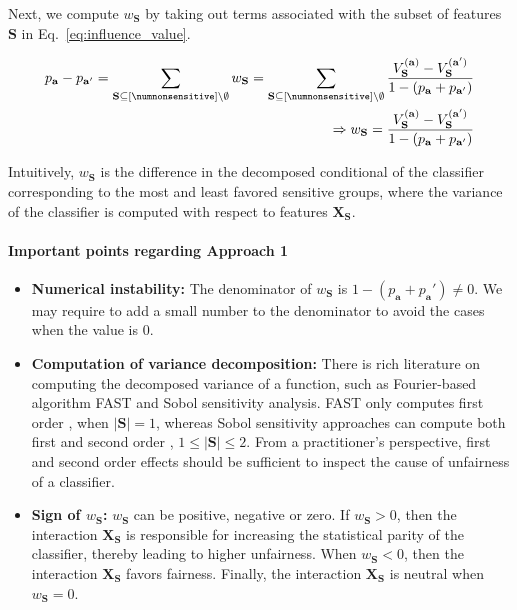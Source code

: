 Next, we compute $ w_{\mathbf{S}} $ by taking out terms associated with the subset of features $ \mathbf{S} $ in Eq.~\ref{eq:influence_value}. 

\begin{align*}
p_\mathbf{a} -  p_\mathbf{a'} =  \sum_{\mathbf{S} \subseteq [\numnonsensitive] \setminus \emptyset} w_{\mathbf{S}} = \sum_{\mathbf{S} \subseteq [\numnonsensitive] \setminus \emptyset} \frac{ V_{\mathbf{S}}^{(\mathbf{a})} - V_{\mathbf{S}}^{(\mathbf{a'})}}{1 - (p_\mathbf{a} + p_\mathbf{a'})} \\
\Rightarrow w_{\mathbf{S}} = \frac{V_{\mathbf{S}}^{(\mathbf{a})} - V_{\mathbf{S}}^{(\mathbf{a'})}}{1 - (p_\mathbf{a} + p_\mathbf{a'})}
\end{align*}


Intuitively, $ w_{\mathbf{S}} $ is the difference in the decomposed conditional  of the classifier corresponding to the most and least favored sensitive groups, where the variance of the classifier is computed with respect to features $ \mathbf{X}_{\mathbf{S}} $. 


\paragraph{Important points regarding Approach 1}
\begin{itemize}
	\item \textbf{Numerical instability:} The denominator of $ w_{\mathbf{S}} $ is $ 1 - (p_\mathbf{a} + p_{\mathbf{a}}') \ne 0 $.  We may require to add a small number to the denominator to avoid the cases when the value is $ 0 $. 
	
	\item \textbf{Computation of variance decomposition:} There is rich literature on computing the decomposed variance of a function, such as Fourier-based algorithm FAST and Sobol sensitivity analysis. FAST only computes first order , when $ |\mathbf{S}| = 1 $, whereas Sobol sensitivity approaches can compute both first and second order , $ 1 \le |\mathbf{S}| \le 2 $. From a practitioner's perspective, first and second order effects should be sufficient to inspect the cause of unfairness of a classifier. 
	
	\item \textbf{Sign of $ w_{\mathbf{S}} $:} $ w_{\mathbf{S}} $ can be  positive, negative or zero. If $ w_{\mathbf{S}} > 0 $, then the interaction $ \mathbf{X}_{\mathbf{S}} $ is responsible for increasing the statistical parity of the classifier, thereby leading to higher unfairness. When $ w_{\mathbf{S}} < 0 $, then the interaction $ \mathbf{X}_{\mathbf{S}} $ favors fairness. Finally, the interaction $ \mathbf{X}_{\mathbf{S}} $ is neutral when $ w_{\mathbf{S}} = 0 $. 
\end{itemize}



